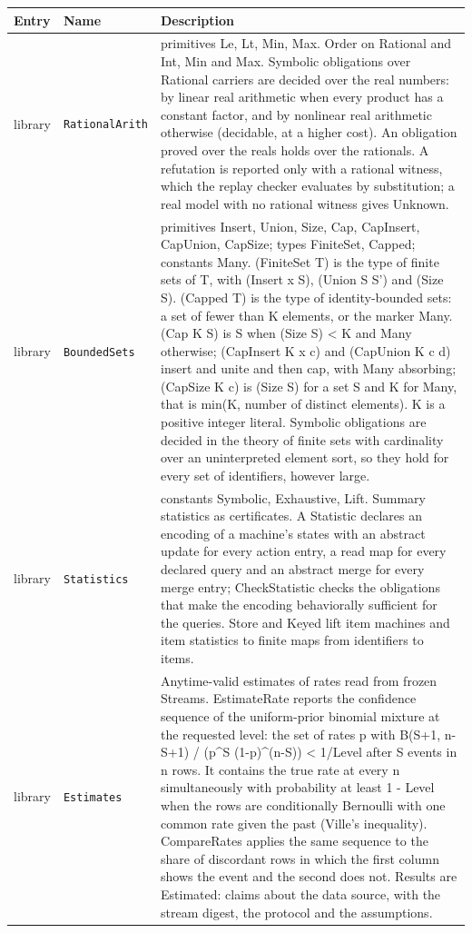 \documentclass[11pt]{article}
\newcommand{\code}[1]{\texttt{#1}}
\theoremstyle{definition}
\theoremstyle{plain}
\begin{document}
\begin{footnotesize}
\begin{longtable}{>{\raggedright\arraybackslash}p{1.9cm}>{\raggedright\arraybackslash}p{3.3cm}>{\raggedright\arraybackslash}p{9.0cm}}
\toprule
Entry & Name & Description\\
\midrule
\endhead
library & \code{RationalArith} & primitives Le, Lt, Min, Max. Order on Rational and Int, Min and Max.  Symbolic obligations over Rational carriers are decided over the real numbers:\allowbreak{} by linear real arithmetic when every product has a constant factor, and by nonlinear real arithmetic otherwise (decidable, at a higher cost).  An obligation proved over the reals holds over the rationals.  A refutation is reported only with a rational witness, which the replay checker evaluates by substitution; a real model with no rational witness gives Unknown.\\
library & \code{BoundedSets} & primitives Insert, Union, Size, Cap, CapInsert, CapUnion, CapSize; types FiniteSet, Capped; constants Many. (FiniteSet T) is the type of finite sets of T, with (Insert x S), (Union S S') and (Size S).  (Capped T) is the type of identity-bounded sets:\allowbreak{} a set of fewer than K elements, or the marker Many.  (Cap K S) is S when (Size S) < K and Many otherwise; (CapInsert K x c) and (CapUnion K c d) insert and unite and then cap, with Many absorbing; (CapSize K c) is (Size S) for a set S and K for Many, that is min(K, number of distinct elements).  K is a positive integer literal.  Symbolic obligations are decided in the theory of finite sets with cardinality over an uninterpreted element sort, so they hold for every set of identifiers, however large.\\
library & \code{Statistics} & constants Symbolic, Exhaustive, Lift. Summary statistics as certificates.  A Statistic declares an encoding of a machine's states with an abstract update for every action entry, a read map for every declared query and an abstract merge for every merge entry; CheckStatistic checks the obligations that make the encoding behaviorally sufficient for the queries.  Store and Keyed lift item machines and item statistics to finite maps from identifiers to items.\\
library & \code{Estimates} & Anytime-valid estimates of rates read from frozen Streams.  EstimateRate reports the confidence sequence of the uniform-prior binomial mixture at the requested level:\allowbreak{} the set of rates p with B(S+1, n-S+1) / (p\textasciicircum{}S (1-p)\textasciicircum{}(n-S)) < 1/Level after S events in n rows.  It contains the true rate at every n simultaneously with probability at least 1 - Level when the rows are conditionally Bernoulli with one common rate given the past (Ville's inequality).  CompareRates applies the same sequence to the share of discordant rows in which the first column shows the event and the second does not.  Results are Estimated:\allowbreak{} claims about the data source, with the stream digest, the protocol and the assumptions.\\

\end{longtable}
\end{footnotesize}
\end{document}
